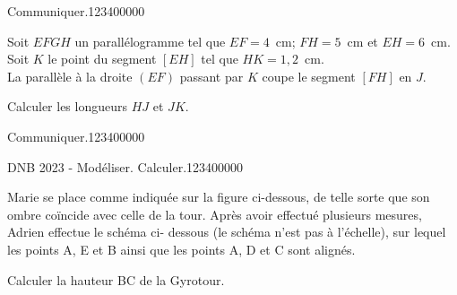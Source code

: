 \begin{pageParcoursu} 

 

\begin{ExoCu}{Communiquer.}{1234}{0}{0}{0}{0}{0}

Soit $EFGH$ un parallélogramme tel que $EF=4$~cm; $FH=5$~cm et
$EH=6$~cm. \\Soit $K$ le point du segment $[EH]$ tel que
$HK=1,2$~cm.\\La parallèle à la droite $(EF)$ passant par $K$ coupe le
segment $[FH]$ en $J$.\par Calculer les longueurs $HJ$ et $JK$.

\end{ExoCu}


\begin{ExoCu}{Communiquer.}{1234}{0}{0}{0}{0}{0}


\end{ExoCu}

 

\begin{ExoCu}{DNB 2023 - Modéliser. Calculer.}{1234}{0}{0}{0}{0}{0}

Marie se place comme indiquée sur la figure ci-dessous, de telle sorte que son ombre coïncide avec celle de la tour. Après avoir effectué plusieurs mesures, Adrien effectue le schéma ci- dessous (le schéma n'est pas à l'échelle), sur lequel les points A, E et B ainsi que les points A, D et C sont alignés.

Calculer la hauteur BC de la Gyrotour.



\end{ExoCu}
\end{pageParcoursu}
